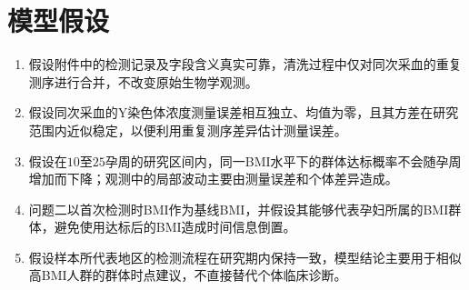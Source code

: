 \section{模型假设}

\begin{enumerate}
  \item 假设附件中的检测记录及字段含义真实可靠，清洗过程中仅对同次采血的重复测序进行合并，不改变原始生物学观测。
  \item 假设同次采血的Y染色体浓度测量误差相互独立、均值为零，且其方差在研究范围内近似稳定，以便利用重复测序差异估计测量误差。
  \item 假设在$10$至$25$孕周的研究区间内，同一BMI水平下的群体达标概率不会随孕周增加而下降；观测中的局部波动主要由测量误差和个体差异造成。
  \item 问题二以首次检测时BMI作为基线BMI，并假设其能够代表孕妇所属的BMI群体，避免使用达标后的BMI造成时间信息倒置。
  \item 假设样本所代表地区的检测流程在研究期内保持一致，模型结论主要用于相似高BMI人群的群体时点建议，不直接替代个体临床诊断。
\end{enumerate}
